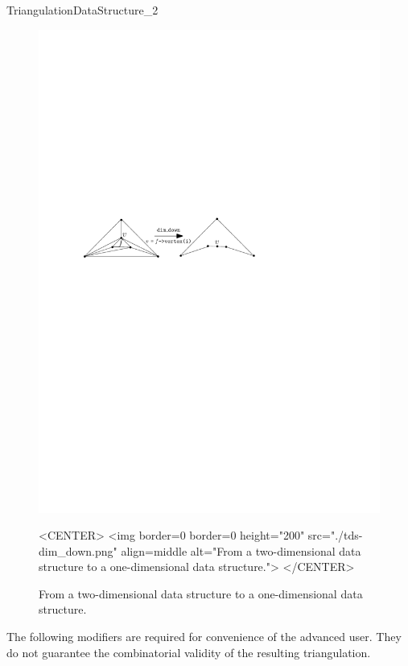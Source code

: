 \begin{ccRefConcept}{TriangulationDataStructure_2}
\begin{figure}
\begin{ccTexOnly}
\begin{center}
\includegraphics[width=1.0\textwidth]{TDS_2_ref/tds-dim_down}
\end{center}
\end{ccTexOnly} 
\caption{From a two-dimensional data structure to a one-dimensional data structure.}
\label{fig-tds-dim_down_2}
\begin{ccHtmlOnly}
<CENTER>
<img border=0 border=0 height="200" src="./tds-dim_down.png" align=middle alt="From a two-dimensional data structure to a one-dimensional data structure.">
</CENTER>
\end{ccHtmlOnly} 
\end{figure}


\begin{ccAdvanced}
The following modifiers are required for convenience of the advanced
user.
They do not guarantee the combinatorial validity 
of the resulting triangulation.


\end{ccAdvanced}
\end{ccRefConcept}

